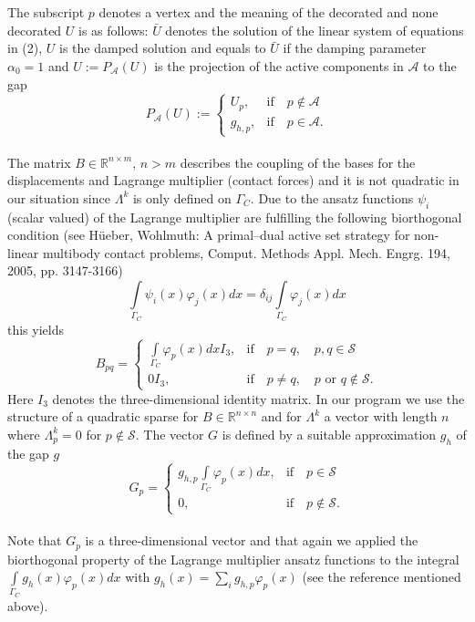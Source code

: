 \documentclass{article}
\begin{document}
\noindent
The subscript $p$ denotes a vertex and the meaning of the
decorated and none decorated $U$ is as follows: $\bar U$ denotes the solution of the linear system of equations in (2), $U$ is the
damped solution and equals to $\bar U$ if the damping parameter $\alpha_0 =
1$ and $\hat U := P_{\mathcal{A}}(U)$ is the projection of the active
components in $\mathcal{A}$ to the gap
$$P_{\mathcal{A}}(U):=\begin{cases}
U_p, & \textrm{if}\quad p\notin\mathcal{A}\\
g_{h,p}, & \textrm{if}\quad
p\in\mathcal{A}.
\end{cases}$$\\
The matrix $B\in\mathbb{R}^{n\times m}$, $n>m$ describes the coupling of the
bases for the displacements and Lagrange multiplier (contact forces)
and it is not quadratic in our situation since $\Lambda^k$ is only defined on
$\Gamma_C$. Due to the ansatz functions $\psi_i$ (scalar valued) of the
Lagrange multiplier are fulfilling the following biorthogonal condition (see Hüeber, Wohlmuth: A primal–dual active
set strategy for non-linear multibody contact problems, Comput. Methods Appl. Mech. Engrg.
194, 2005, pp. 3147-3166)
$$ \int\limits_{\Gamma_C}\psi_i(x)\varphi_j(x)dx =
\delta_{ij}\int\limits_{\Gamma_C}\varphi_j(x)dx$$
this yields
$$B_{pq} = \begin{cases}
\int\limits_{\Gamma_C}\varphi_p(x)dxI_3, & \text{if}\quad p=q,\quad
p,q\in\mathcal{S}\\
0I_3, & \text{if}\quad p\neq q,\quad p\textrm{ or }q\notin\mathcal{S}.
\end{cases}$$
Here $I_3$ denotes the three-dimensional identity matrix.
In our program we use the structure of a quadratic sparse for
$B\in\mathbb{R}^{n\times n}$ and for $\Lambda^k$ a vector with length $n$ where
$\Lambda^k_p = 0$ for $p\notin \mathcal{S}$.
The vector $G$ is defined by a suitable approximation $g_h$ of the gap $g$
$$G_p = \begin{cases}
g_{h,p}\int\limits_{\Gamma_C}\varphi_p(x)dx, & \text{if}\quad p\in\mathcal{S}\\
0, & \text{if}\quad p\notin\mathcal{S}.
\end{cases}$$\\
Note that $G_p$ is a three-dimensional vector and that again we applied the
biorthogonal property of the Lagrange multiplier ansatz functions to the
integral $\int\limits_{\Gamma_C}g_h(x)\varphi_p(x)dx$ with $g_h(x)=\sum\limits_i
g_{h,p}\varphi_p(x)$ (see the reference mentioned above).\\
\end{document}
